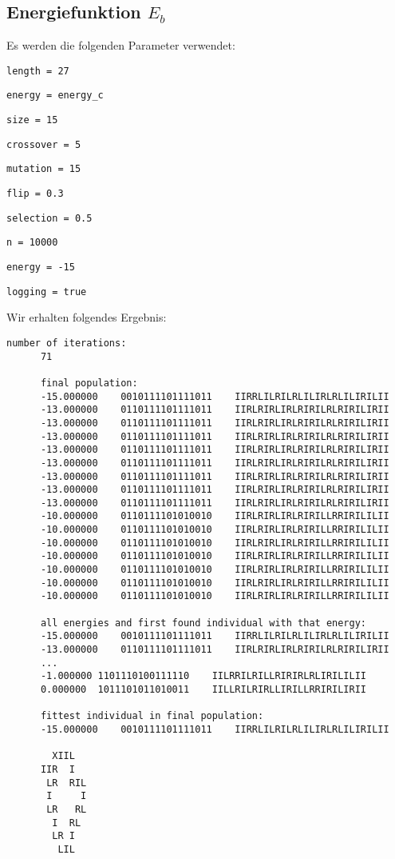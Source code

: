 \documentclass[parskip=half,paper=a4]{scrartcl}
\begin{document}
  \subsection{Energiefunktion $E_b$} 
    Es werden die folgenden Parameter verwendet:
    \begin{compactitem}[--]
      \item \lstinline-length = 27-
      \item \lstinline-energy = energy_c-
      \item \lstinline-size = 15-
      \item \lstinline-crossover = 5-
      \item \lstinline-mutation = 15-
      \item \lstinline-flip = 0.3-
      \item \lstinline-selection = 0.5-
      \item \lstinline-n = 10000-
      \item \lstinline|energy = -15|
      \item \lstinline-logging = true-
    \end{compactitem}
    
    Wir erhalten folgendes Ergebnis:
    \begin{lstlisting}[gobble=6,basicstyle=\small\ttfamily]
      number of iterations:
      71
      
      final population:
      -15.000000	0010111101111011	IIRRLILRILRLILIRLRLILIRILII
      -13.000000	0110111101111011	IIRLRIRLIRLRIRILRLRIRILIRII
      -13.000000	0110111101111011	IIRLRIRLIRLRIRILRLRIRILIRII
      -13.000000	0110111101111011	IIRLRIRLIRLRIRILRLRIRILIRII
      -13.000000	0110111101111011	IIRLRIRLIRLRIRILRLRIRILIRII
      -13.000000	0110111101111011	IIRLRIRLIRLRIRILRLRIRILIRII
      -13.000000	0110111101111011	IIRLRIRLIRLRIRILRLRIRILIRII
      -13.000000	0110111101111011	IIRLRIRLIRLRIRILRLRIRILIRII
      -13.000000	0110111101111011	IIRLRIRLIRLRIRILRLRIRILIRII
      -10.000000	0110111101010010	IIRLRIRLIRLRIRILLRRIRILILII
      -10.000000	0110111101010010	IIRLRIRLIRLRIRILLRRIRILILII
      -10.000000	0110111101010010	IIRLRIRLIRLRIRILLRRIRILILII
      -10.000000	0110111101010010	IIRLRIRLIRLRIRILLRRIRILILII
      -10.000000	0110111101010010	IIRLRIRLIRLRIRILLRRIRILILII
      -10.000000	0110111101010010	IIRLRIRLIRLRIRILLRRIRILILII
      -10.000000	0110111101010010	IIRLRIRLIRLRIRILLRRIRILILII
      
      all energies and first found individual with that energy:
      -15.000000	0010111101111011	IIRRLILRILRLILIRLRLILIRILII
      -13.000000	0110111101111011	IIRLRIRLIRLRIRILRLRIRILIRII
      ...
      -1.000000	1101110100111110	IILRRILRILLRIRIRLRLIRILILII
      0.000000	1011101011010011	IILLRILRIRLLIRILLRRIRILIRII
      
      fittest individual in final population:
      -15.000000	0010111101111011	IIRRLILRILRLILIRLRLILIRILII
      
        XIIL  
      IIR  I  
       LR  RIL
       I     I
       LR   RL
        I  RL 
        LR I  
         LIL  
    \end{lstlisting}
    
\end{document}
